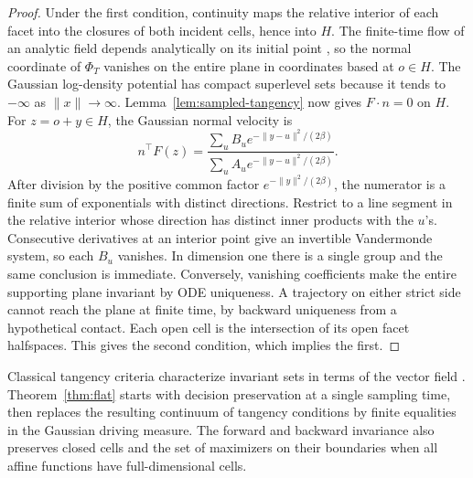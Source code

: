 \begin{proof}
Under the first condition, continuity maps the relative interior of each
facet into the closures of both incident cells, hence into $H$.
The finite-time flow of an analytic field depends analytically on its
initial point \cite{carrillo}, so the normal coordinate of $\Phi_T$
vanishes on the entire plane in coordinates based at $o\in H$.
The Gaussian log-density potential has compact superlevel sets because
it tends to $-\infty$ as $\|x\|\to\infty$. Lemma~\ref{lem:sampled-tangency}
now gives $F\cdot n=0$ on $H$.
For $z=o+y\in H$, the Gaussian normal velocity is
\begin{equation}
 n^\top F(z)=
 \frac{\sum_u B_u e^{-\lVert y-u\rVert^2/(2\beta)}}
      {\sum_u A_u e^{-\lVert y-u\rVert^2/(2\beta)}} .
 \label{eq:facetvelocity}
\end{equation}
After division by the positive common factor $e^{-\lVert y\rVert^2/(2\beta)}$,
the numerator is a finite sum of exponentials with distinct directions.
Restrict to a line segment in the relative interior whose direction
has distinct inner products with the $u$'s. Consecutive derivatives
at an interior point give an invertible Vandermonde system, so each
$B_u$ vanishes. In dimension one there is a single group and the same
conclusion is immediate. Conversely, vanishing coefficients make the
entire supporting plane invariant by ODE uniqueness. A trajectory on
either strict side cannot reach the plane at finite time, by backward
uniqueness from a hypothetical contact. Each open cell is the
intersection of its open facet halfspaces. This gives the second
condition, which implies the first.
\end{proof}

Classical tangency criteria characterize invariant sets in terms of the
vector field \cite{nagumo,brezis}. Theorem~\ref{thm:flat} starts with decision
preservation at a single sampling time, then replaces the resulting
continuum of tangency conditions by finite equalities in the Gaussian
driving measure. The forward and backward invariance also preserves
closed cells and the set of maximizers on their boundaries when all
affine functions have full-dimensional cells.

